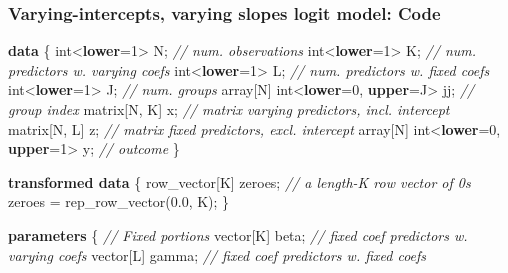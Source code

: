 \documentclass[
  11pt,
]{article}
\newenvironment{Shaded}{\begin{snugshade}}{\end{snugshade}}
\newcommand{\CommentTok}[1]{\textcolor[rgb]{0.56,0.35,0.01}{\textit{#1}}}
\newcommand{\DataTypeTok}[1]{\textcolor[rgb]{0.13,0.29,0.53}{#1}}
\newcommand{\DecValTok}[1]{\textcolor[rgb]{0.00,0.00,0.81}{#1}}
\newcommand{\FloatTok}[1]{\textcolor[rgb]{0.00,0.00,0.81}{#1}}
\newcommand{\KeywordTok}[1]{\textcolor[rgb]{0.13,0.29,0.53}{\textbf{#1}}}
\newcommand{\NormalTok}[1]{#1}
\begin{document}
\hypertarget{varying-intercepts-varying-slopes-logit-model-code}{%
\subsubsection{Varying-intercepts, varying slopes logit model: Code}\label{varying-intercepts-varying-slopes-logit-model-code}}

\begin{Shaded}
\begin{Highlighting}[]
\KeywordTok{data}\NormalTok{ \{}
  \DataTypeTok{int}\NormalTok{\textless{}}\KeywordTok{lower}\NormalTok{=}\DecValTok{1}\NormalTok{\textgreater{} N;                      }\CommentTok{// num. observations}
  \DataTypeTok{int}\NormalTok{\textless{}}\KeywordTok{lower}\NormalTok{=}\DecValTok{1}\NormalTok{\textgreater{} K;                      }\CommentTok{// num. predictors w. varying coefs}
  \DataTypeTok{int}\NormalTok{\textless{}}\KeywordTok{lower}\NormalTok{=}\DecValTok{1}\NormalTok{\textgreater{} L;                      }\CommentTok{// num. predictors w. fixed coefs}
  \DataTypeTok{int}\NormalTok{\textless{}}\KeywordTok{lower}\NormalTok{=}\DecValTok{1}\NormalTok{\textgreater{} J;                      }\CommentTok{// num. groups}
  \DataTypeTok{array}\NormalTok{[N] }\DataTypeTok{int}\NormalTok{\textless{}}\KeywordTok{lower}\NormalTok{=}\DecValTok{0}\NormalTok{, }\KeywordTok{upper}\NormalTok{=J\textgreater{} jj;   }\CommentTok{// group index}
  \DataTypeTok{matrix}\NormalTok{[N, K] x;                      }\CommentTok{// matrix varying predictors, incl. intercept}
  \DataTypeTok{matrix}\NormalTok{[N, L] z;                      }\CommentTok{// matrix fixed predictors, excl. intercept}
  \DataTypeTok{array}\NormalTok{[N] }\DataTypeTok{int}\NormalTok{\textless{}}\KeywordTok{lower}\NormalTok{=}\DecValTok{0}\NormalTok{, }\KeywordTok{upper}\NormalTok{=}\DecValTok{1}\NormalTok{\textgreater{} y;    }\CommentTok{// outcome}
\NormalTok{\}}

\KeywordTok{transformed data}\NormalTok{ \{}
  \DataTypeTok{row\_vector}\NormalTok{[K] zeroes;               }\CommentTok{// a length{-}K row vector of 0\textquotesingle{}s}
\NormalTok{  zeroes = rep\_row\_vector(}\FloatTok{0.0}\NormalTok{, K);}
\NormalTok{\}}

\KeywordTok{parameters}\NormalTok{ \{}
  \CommentTok{// Fixed portions}
  \DataTypeTok{vector}\NormalTok{[K] beta;      }\CommentTok{// fixed coef predictors w. varying coefs}
  \DataTypeTok{vector}\NormalTok{[L] gamma;     }\CommentTok{// fixed coef predictors w. fixed coefs}
  

\end{Highlighting}
\end{Shaded}
\end{document}
